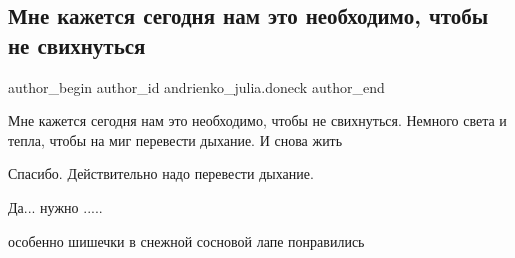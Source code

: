  
 
 
 
 
 
\subsection{Мне кажется сегодня нам это необходимо, чтобы не свихнуться}
\label{sec:26_12_2016.fb.andrienko_julia.doneck.1.sveta_i_tepla}
 
\ifcmt
 author_begin
   author_id andrienko_julia.doneck
 author_end
\fi

Мне кажется сегодня нам это необходимо, чтобы не свихнуться. Немного света и
тепла, чтобы на миг перевести дыхание. И снова жить


\begin{itemize} %
Спасибо. Действительно надо перевести дыхание.

Да... нужно .....

особенно шишечки в снежной сосновой лапе понравились
\end{itemize} %

